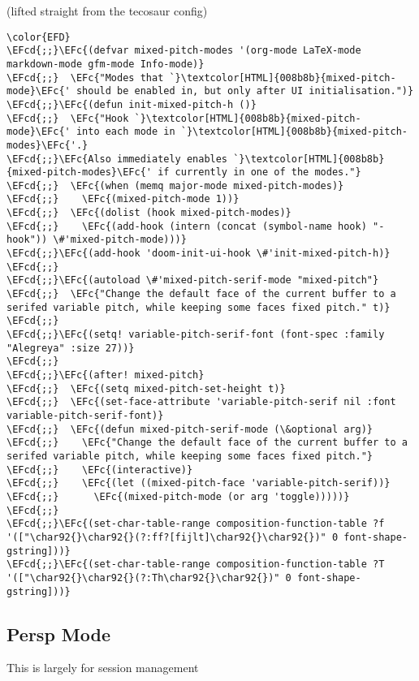 \documentclass{article}
\newcommand{\EFc}[1]{\textcolor{EFc}{#1}} %
\newcommand{\EFcd}[1]{\textcolor{EFcd}{#1}} %
\begin{document}
(lifted straight from the tecosaur config)
\begin{Code}
\begin{Verbatim}
\color{EFD}
\EFcd{;;}\EFc{(defvar mixed-pitch-modes '(org-mode LaTeX-mode markdown-mode gfm-mode Info-mode)}
\EFcd{;;}  \EFc{"Modes that `}\textcolor[HTML]{008b8b}{mixed-pitch-mode}\EFc{' should be enabled in, but only after UI initialisation.")}
\EFcd{;;}\EFc{(defun init-mixed-pitch-h ()}
\EFcd{;;}  \EFc{"Hook `}\textcolor[HTML]{008b8b}{mixed-pitch-mode}\EFc{' into each mode in `}\textcolor[HTML]{008b8b}{mixed-pitch-modes}\EFc{'.}
\EFcd{;;}\EFc{Also immediately enables `}\textcolor[HTML]{008b8b}{mixed-pitch-modes}\EFc{' if currently in one of the modes."}
\EFcd{;;}  \EFc{(when (memq major-mode mixed-pitch-modes)}
\EFcd{;;}    \EFc{(mixed-pitch-mode 1))}
\EFcd{;;}  \EFc{(dolist (hook mixed-pitch-modes)}
\EFcd{;;}    \EFc{(add-hook (intern (concat (symbol-name hook) "-hook")) \#'mixed-pitch-mode)))}
\EFcd{;;}\EFc{(add-hook 'doom-init-ui-hook \#'init-mixed-pitch-h)}
\EFcd{;;}
\EFcd{;;}\EFc{(autoload \#'mixed-pitch-serif-mode "mixed-pitch"}
\EFcd{;;}  \EFc{"Change the default face of the current buffer to a serifed variable pitch, while keeping some faces fixed pitch." t)}
\EFcd{;;}
\EFcd{;;}\EFc{(setq! variable-pitch-serif-font (font-spec :family "Alegreya" :size 27))}
\EFcd{;;}
\EFcd{;;}\EFc{(after! mixed-pitch}
\EFcd{;;}  \EFc{(setq mixed-pitch-set-height t)}
\EFcd{;;}  \EFc{(set-face-attribute 'variable-pitch-serif nil :font variable-pitch-serif-font)}
\EFcd{;;}  \EFc{(defun mixed-pitch-serif-mode (\&optional arg)}
\EFcd{;;}    \EFc{"Change the default face of the current buffer to a serifed variable pitch, while keeping some faces fixed pitch."}
\EFcd{;;}    \EFc{(interactive)}
\EFcd{;;}    \EFc{(let ((mixed-pitch-face 'variable-pitch-serif))}
\EFcd{;;}      \EFc{(mixed-pitch-mode (or arg 'toggle)))))}
\EFcd{;;}
\EFcd{;;}\EFc{(set-char-table-range composition-function-table ?f '(["\char92{}\char92{}(?:ff?[fijlt]\char92{}\char92{})" 0 font-shape-gstring]))}
\EFcd{;;}\EFc{(set-char-table-range composition-function-table ?T '(["\char92{}\char92{}(?:Th\char92{}\char92{})" 0 font-shape-gstring]))}
\end{Verbatim}
\end{Code}
\subsection{Persp Mode}
\label{sec:orgc168dce}
This is largely for session management
\end{document}
